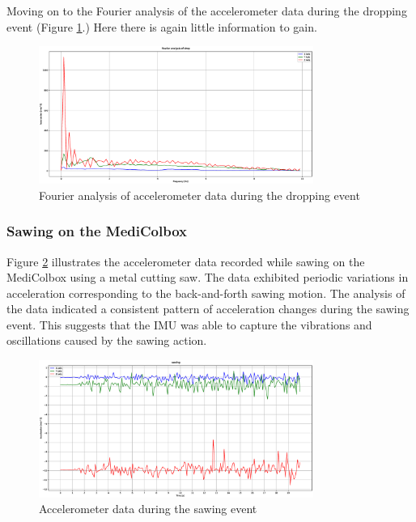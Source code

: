 \documentclass[../main.tex]{subfiles}
\begin{document}
Moving on to the Fourier analysis of the accelerometer data during the
dropping event (Figure \ref{fig:fourier_accelerometer_dropping}.)
Here there is again little information to gain.

\begin{figure}[htbp]
    \centering
    \includegraphics[width=0.8\textwidth]{resources/figures/Fourier_acceleration_drop.eps}
    \caption{Fourier analysis of accelerometer data during the dropping event}
    \label{fig:fourier_accelerometer_dropping}
\end{figure}

\clearpage

\subsubsection{Sawing on the MediColbox}

Figure \ref{fig:accelerometer_sawing} illustrates the
accelerometer data recorded while sawing on the
MediColbox using a metal cutting saw.
The data exhibited periodic variations in acceleration
corresponding to the back-and-forth sawing motion.
The analysis of the data indicated a consistent pattern of
acceleration changes during the sawing event. This suggests that the IMU was able to capture the vibrations and oscillations caused by the sawing action.

\begin{figure}[htbp]
    \centering
    \includegraphics[width=0.8\textwidth]{resources/figures/Acceleration_sawing.eps}
    \caption{Accelerometer data during the sawing event}
    \label{fig:accelerometer_sawing}
\end{figure}
\end{document}
